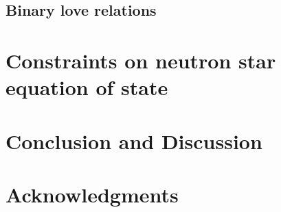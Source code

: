 \documentclass[prd,twocolumn,nofootinbib,superscriptaddress,amsmath,amssymb]{revtex4-1}
\begin{document}
\subsection{Binary love relations}\label{sec:binary}

\section{Constraints on neutron star equation of state}\label{sec:constraints}

\section{Conclusion and Discussion}\label{sec:conclusion}

\section*{Acknowledgments}\label{acknowledgments}




%
\end{document}
